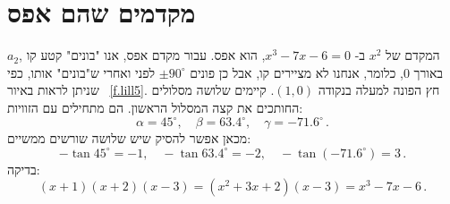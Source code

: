 


\section{מקדמים שהם אפס}\label{s.zero}

$a_2$,
המקדם של
$x^2$
ב-%
$x^3-7x-6=0$,
הוא אפס. עבור מקדם אפס, אנו "בונים" קטע קו באורך
$0$,
כלומר, אנחנו לא מציירים קו, אבל כן פונים
$\pm 90^\circ$
לפני ואחרי ש"בונים" אותו, כפי שניתן לראות באיור~%
\ref{f.lill5}.
חץ הפונה למעלה בנקודה
$(1,0)$.
קיימים שלושה מסלולים החותכים את קצה המסלול הראשון. הם מתחילים עם הזוויות:
\[
\alpha=45^\circ,\quad \beta=63.4^\circ,\quad \gamma=-71.6^\circ\,.
\]
מכאן אפשר להסיק שיש שלושה שורשים ממשיים:
\[
-\tan 45^\circ=-1,\quad -\tan 63.4^\circ =-2,\quad -\tan (-71.6^\circ)=3\,.
\]
בדיקה:
\[
(x+1)(x+2)(x-3)=(x^2+3x+2)(x-3) =x^3-7x-6\,.
\]
